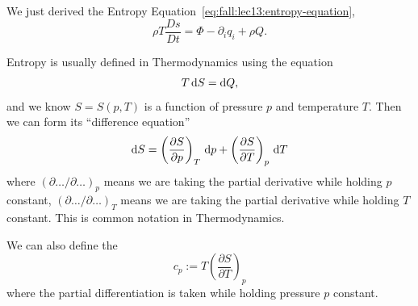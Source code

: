 

\begin{recall}
We just derived the Entropy Equation~\eqref{eq:fall:lec13:entropy-equation},
\begin{equation}
\rho T\frac{D s}{D t}=\Phi-\partial_{i}q_{i}+\rho Q.
\end{equation}
\end{recall}

\begin{node}
Entropy is usually defined in Thermodynamics using the equation
\begin{equation}
T\,\mathrm{d} S = \mathrm{d} Q,
\end{equation}
and we know $S=S(p,T)$ is a function of pressure $p$ and temperature $T$.
Then we can form its ``difference equation''
\begin{equation}\label{eq:fall:lec14:eq1}
\mathrm{d} S = \left(\frac{\partial S}{\partial p}\right)_{T}\,\mathrm{d} p +
\left(\frac{\partial S}{\partial T}\right)_{p}\,\mathrm{d} T
\end{equation}
where $(\partial\dots/\partial\dots)_{p}$ means we are taking the
partial derivative while holding $p$ constant,
$(\partial\dots/\partial\dots)_{T}$ means we are taking the partial
derivative while holding $T$ constant. This is common notation in Thermodynamics.
\end{node}

\begin{definition}
We can also define the 
\begin{equation}
c_{p} := T \left(\frac{\partial S}{\partial T}\right)_{p}
\end{equation}
where the partial differentiation is taken while holding pressure $p$ constant.
\end{definition}

